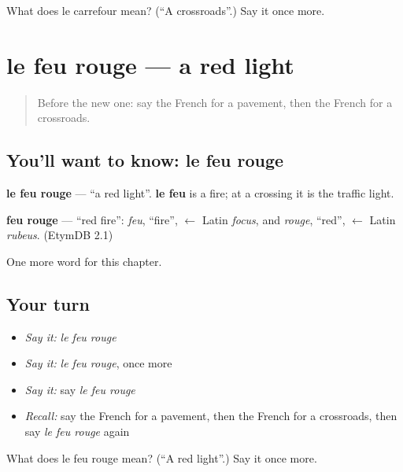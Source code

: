 \begin{tcolorbox}[breakable,colback=teal!4,colframe=teal!35!black,title={Before you move on}]
What does le carrefour mean? (\textquotedblleft{}A crossroads\textquotedblright{}.) Say it once more.
\end{tcolorbox}
\section[le feu rouge]{le feu rouge — a red light}

\label{lesson:FR-C108-feu-rouge}



\begin{quote}
Before the new one: say the French for a pavement, then the French for a crossroads.
\end{quote}

\subsection*{You'll want to know: le feu rouge}
\textbf{le feu rouge} — \textquotedblleft{}a red light\textquotedblright{}. \textbf{le feu} is a fire; at a crossing it is the traffic light.

\begin{cousinweb}
\textbf{feu rouge} — \textquotedblleft{}red fire\textquotedblright{}: \emph{feu}, \textquotedblleft{}fire\textquotedblright{}, $\leftarrow$ Latin \emph{focus}, and \emph{rouge}, \textquotedblleft{}red\textquotedblright{}, $\leftarrow$ Latin \emph{rubeus}. (EtymDB 2.1)
\end{cousinweb}

\begin{grammarlens}[title={What you've built}]
One more word for this chapter.
\end{grammarlens}

\subsection*{Your turn}
\begin{itemize}
\raggedright
  \item \emph{Say it:} \emph{le feu rouge}
  \item \emph{Say it:} \emph{le feu rouge}, once more
  \item \emph{Say it:} say \emph{le feu rouge}
  \item \emph{Recall:} say the French for a pavement, then the French for a crossroads, then say \emph{le feu rouge} again
\end{itemize}

\begin{tcolorbox}[breakable,colback=teal!4,colframe=teal!35!black,title={Before you move on}]
What does le feu rouge mean? (\textquotedblleft{}A red light\textquotedblright{}.) Say it once more.
\end{tcolorbox}
